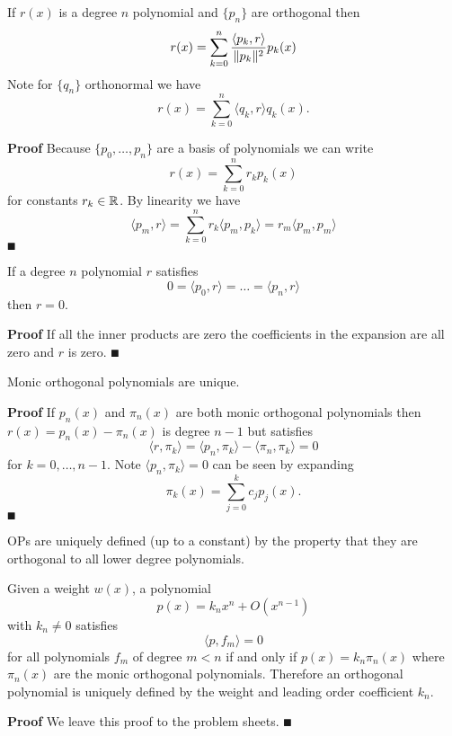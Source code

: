 \begin{proposition}[expansion] If $r(x)$ is a degree $n$ polynomial and $\{p_n\}$ are orthogonal then
\[
r(x) = \ensuremath{\sum}_{k=0}^n {\ensuremath{\langle}p_k,r\ensuremath{\rangle} \over \|p_k\|^2} p_k(x)
\]
Note for $\{q_n\}$ orthonormal we have
\[
r(x) = \ensuremath{\sum}_{k=0}^n \ensuremath{\langle}q_k,r\ensuremath{\rangle} q_k(x).
\]
\end{proposition}
\textbf{Proof} Because $\{p_0,\ensuremath{\ldots},p_n \}$ are a basis of polynomials we can write
\[
r(x) = \ensuremath{\sum}_{k=0}^n r_k p_k(x)
\]
for constants $r_k \in {\mathbb R}$. By linearity we have
\[
\ensuremath{\langle}p_m,r\ensuremath{\rangle} = \ensuremath{\sum}_{k=0}^n r_k \ensuremath{\langle}p_m,p_k\ensuremath{\rangle}= r_m \ensuremath{\langle}p_m,p_m\ensuremath{\rangle}
\]
\ensuremath{\QED}

\begin{corollary} If a degree $n$ polynomial $r$ satisfies
\[
0 = \ensuremath{\langle}p_0,r\ensuremath{\rangle} = \ensuremath{\ldots} = \ensuremath{\langle}p_n,r\ensuremath{\rangle}
\]
then $r = 0$.

\end{corollary}
\textbf{Proof} If all the inner products are zero the coefficients in the expansion are all zero and $r$ is zero. \ensuremath{\QED}

\begin{corollary}[uniqueness] Monic orthogonal polynomials are unique.

\end{corollary}
\textbf{Proof} If $p_n(x)$ and $\ensuremath{\pi}_n(x)$ are both monic orthogonal polynomials then $r(x) = p_n(x) - \ensuremath{\pi}_n(x)$ is degree $n-1$ but satisfies
\[
\ensuremath{\langle}r, \ensuremath{\pi}_k\ensuremath{\rangle} = \ensuremath{\langle}p_n, \ensuremath{\pi}_k\ensuremath{\rangle} - \ensuremath{\langle}\ensuremath{\pi}_n, \ensuremath{\pi}_k\ensuremath{\rangle} = 0
\]
for $k = 0,\ensuremath{\ldots},{n-1}$. Note $\ensuremath{\langle}p_n, \ensuremath{\pi}_k\ensuremath{\rangle} = 0$ can be seen by expanding
\[
\ensuremath{\pi}_k(x) = \ensuremath{\sum}_{j=0}^k c_j p_j(x).
\]
\ensuremath{\QED}

OPs are uniquely defined (up to a constant) by the property that they are orthogonal to all lower degree polynomials.

\begin{theorem} Given a weight $w(x)$, a polynomial
\[
p(x) = k_n x^n + O(x^{n-1})
\]
with $k_n \ensuremath{\neq} 0$ satisfies
\[
\ensuremath{\langle}p,f_m\ensuremath{\rangle} = 0
\]
for all  polynomials $f_m$ of degree $m < n$ if and only if $p(x) = k_n \ensuremath{\pi}_n(x)$ where $\ensuremath{\pi}_n(x)$ are the monic orthogonal polynomials. Therefore an orthogonal polynomial is uniquely defined by the weight and leading order coefficient $k_n$.

\end{theorem}
\textbf{Proof} We leave this proof to the problem sheets. \ensuremath{\QED}

